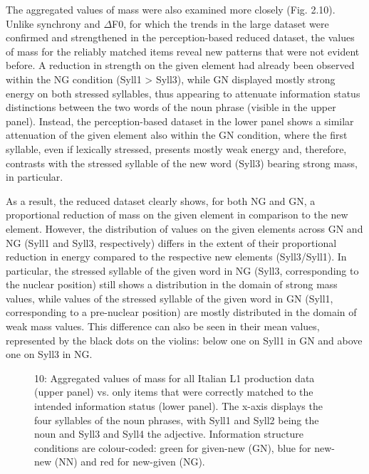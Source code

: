 The aggregated values of mass were also examined more closely (Fig. 2.10). Unlike synchrony and ${\Delta}$F0, for which the trends in the large dataset were confirmed and strengthened in the perception-based reduced dataset, the values of mass for the reliably matched items reveal new patterns that were not evident before. A reduction in strength on the given element had already been observed within the NG condition (Syll1 > Syll3), while GN displayed mostly strong energy on both stressed syllables, thus appearing to attenuate information status distinctions between the two words of the noun phrase (visible in the upper panel). Instead, the perception-based dataset in the lower panel shows a similar attenuation of the given element also within the GN condition, where the first syllable, even if lexically stressed, presents mostly weak energy and, therefore, contrasts with the stressed syllable of the new word (Syll3) bearing strong mass, in particular.

As a result, the reduced dataset clearly shows, for both NG and GN, a proportional reduction of mass on the given element in comparison to the new element. However, the distribution of values on the given elements across GN and NG (Syll1 and Syll3, respectively) differs in the extent of their proportional reduction in energy compared to the respective new elements (Syll3/Syll1). In particular, the stressed syllable of the given word in NG (Syll3, corresponding to the nuclear position) still shows a distribution in the domain of strong mass values, while values of the stressed syllable of the given word in GN (Syll1, corresponding to a pre-nuclear position) are mostly distributed in the domain of weak mass values. This difference can also be seen in their mean values, represented by the black dots on the violins: below one on Syll1 in GN and above one on Syll3 in NG.

  
 

\begin{stylecaption}\begin{figure}
\caption{10: Aggregated values of mass for all Italian L1 production data (upper panel) vs. only items that were correctly matched to the intended information status (lower panel). The x-axis displays the four syllables of the noun phrases, with Syll1 and Syll2 being the noun and Syll3 and Syll4 the adjective. Information structure conditions are colour-coded: green for given-new (GN), blue for new-new (NN) and red for new-given (NG).}
\label{fig:key:2}
\end{figure}\end{stylecaption}


